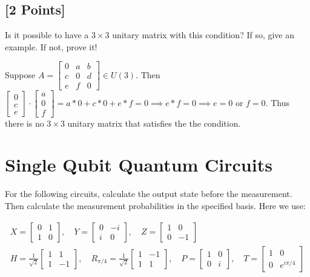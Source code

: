 \documentclass[11pt]{article}
\begin{document}
\subsection{[2 Points]} Is it possible to have a $3 \times 3$ unitary matrix with this condition? If so, give an example. If not, prove it!

\begin{solution}
    Suppose $A = \begin{bmatrix}
        0 & a & b \\
        c & 0 & d \\
        e & f & 0
    \end{bmatrix} \in U(3)$. Then $\begin{bmatrix}
        0 \\ c \\ e
    \end{bmatrix} \cdot \begin{bmatrix}
        a \\ 0 \\ f
    \end{bmatrix} = a * 0 + c * 0 + e  * f = 0 \implies e * f = 0 \implies e = 0$ or $f = 0$. Thus there is no $3 \times 3$ unitary matrix that satisfies the the condition.       
\end{solution}

\section{Single Qubit Quantum Circuits} For the following circuits, calculate the output state before the measurement. Then calculate the measurement probabilities in the specified basis. Here we use:

\begin{gather*}
X = \begin{bmatrix} 0 & 1 \\ 1 & 0 \end{bmatrix},\quad Y = \begin{bmatrix} 0 & -i \\ i & 0 \end{bmatrix},\quad Z = \begin{bmatrix} 1 & 0 \\ 0 & -1 \end{bmatrix}\\
H = \frac{1}{\sqrt{2}} \begin{bmatrix} 1 & 1 \\ 1 & -1 \end{bmatrix},\quad R_{\pi/4} = \frac{1}{\sqrt{2}} \begin{bmatrix} 1 & -1 \\ 1 & 1 \end{bmatrix},\quad P = \begin{bmatrix} 1 & 0 \\ 0 & i \end{bmatrix},\quad T = \begin{bmatrix} 1 & 0 \\ 0 & e^{i\pi/4} \end{bmatrix}
\end{gather*}
\end{document}

